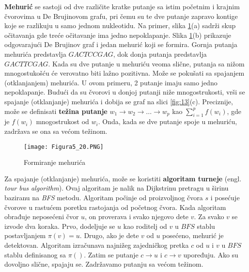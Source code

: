 \documentclass[12pt,oneside]{memoir}
\begin{document}
\textbf{Mehurić} se sastoji od dve različite kratke putanje sa istim početnim i
krajnim čvorovima u De Brujinovom grafu, pri čemu su te dve putanje zapravo kontige koje se razlikuju u samo jednom nukleotidu. Na primer, slika \ref{fig:133}(a) sadrži skup očitavanja gde treće očitavanje ima jedno nepoklapanje. Slika \ref{fig:133}(b) prikazuje odgovarajući De Brujinov graf i jedan mehurić koji se formira. Gornja putanja mehurića predstavlja $GACTCCGAG$, dok donja putanja predstavlja $GACTTCGAG$. Kada su dve putanje u mehuriću veoma slične, putanja sa nižom mnogostukošću će verovatno biti lažno pozitivna. Može se pokušati sa spajanjem (otklanjanjem) mehurića. U ovom primeru, 2 putanje imaju samo jedno nepoklapanje. Budući da su čvorovi u donjoj putanji niže mnogostrukosti, vrši se spajanje (otklanjanje) mehurića i dobija se graf na slici \ref{fig:13}(c). Preciznije, može se definisati \textbf{težina putanje} $w_1 \rightarrow w_2 \rightarrow ... \rightarrow w_p$ kao $\sum_{i=1}^{p} f(w_i)$, gde je $f(w_i)$ mnogostrukost od $w_i$. Onda, kada se dve putanje spoje u mehuriću, zadržava se ona sa većom težinom.

\begin{figure}[!ht]
\centering
\texttt{[image: Figura5\_20.PNG]}
\caption{Formiranje mehurića}
\label{fig:133}
\end{figure}

Za spajanje (otklanjanje) mehurića, može se koristiti \textbf{algoritam turneje} (engl. \textit{tour bus algorithm}). Ovaj algoritam je nalik na Dijkstrinu pretragu u širinu baziranu na \textit{BFS} metodu. Algoritam počinje od proizvoljnog čvora $s$ i posećuje čvorove u rastućem poretku rastojanja od početnog čvora. Kada algoritam obrađuje neposećeni čvor $u$, on proverava i svako njegovo dete $v$. Za svako $v$ se izvode dva koraka. Prvo, dodeljuje se $u$ kao roditelj od $v$ u $BFS$ stablu postavljanjem $\pi (v) = u$. Drugo, ako je dete $v$ od $u$ posećeno, mehurić je detektovan. Algoritam izračunava najnižeg zajedničkog pretka $c$ od $u$ i $v$ u $BFS$ stablu definisanog sa $\pi ()$. Zatim se putanje $c \rightarrow u$ i $c \rightarrow v$ upoređuju. Ako su dovoljno slične, spajaju se. Zadržavamo putanju sa većom težinom.
\end{document}
